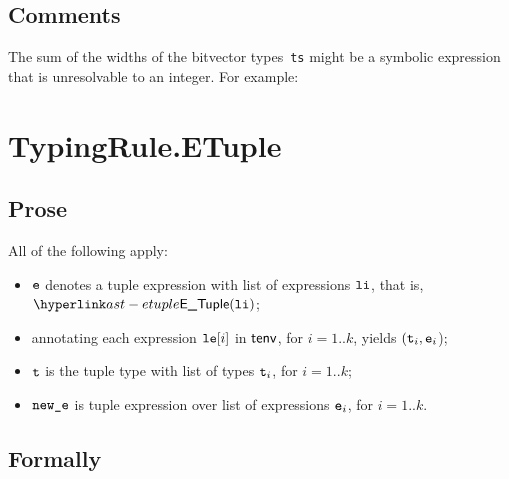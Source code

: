 \subsection{Comments}
The sum of the widths of the bitvector types~\texttt{ts} might be a symbolic
expression that is unresolvable to an integer. For example:


\section{TypingRule.ETuple \label{sec:TypingRule.ETuple}}

\subsection{Prose}
All of the following apply:
\begin{itemize}
  \item $\ve$ denotes a tuple expression with list of expressions $\vli$, that is, $ \ETuple(\vli)$;
  \item annotating each expression $\vle[i]$ in $\tenv$, for $i=1..k$, yields $(\vt_i, \ve_i$)\ProseOrTypeError;
  \item $\vt$ is the tuple type with list of types $\vt_i$, for $i=1..k$;
  \item $\newe$ is tuple expression over list of expressions $\ve_i$, for $i=1..k$.
\end{itemize}



\subsection{Formally}
\begin{mathpar}
\end{mathpar}


